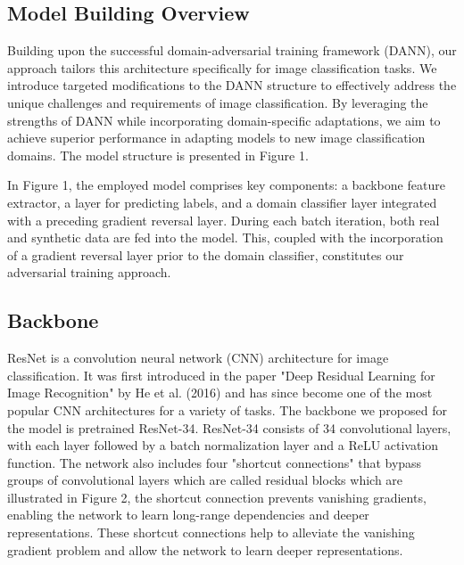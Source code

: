 \documentclass[nonacm, sigconf]{acmart}
\begin{document}
\subsection{Model Building Overview}
Building upon the successful domain-adversarial training framework (DANN), our approach tailors this architecture specifically for image classification tasks. We introduce targeted modifications to the DANN structure to effectively address the unique challenges and requirements of image classification. By leveraging the strengths of DANN while incorporating domain-specific adaptations, we aim to achieve superior performance in adapting models to new image classification domains. The model structure is presented in Figure 1.

\noindent In Figure 1, the employed model comprises key components: a backbone feature extractor, a layer for predicting labels, and a domain classifier layer integrated with a preceding gradient reversal layer. During each batch iteration, both real and synthetic data are fed into the model. This, coupled with the incorporation of a gradient reversal layer prior to the domain classifier, constitutes our adversarial training approach.
\subsection{Backbone}
ResNet is a convolution neural network (CNN) architecture for image classification. It was first introduced in the paper "Deep Residual Learning for Image Recognition" by He et al. (2016)\cite{20} and has since become one of the most popular CNN architectures for a variety of tasks. The backbone we proposed for the model is pretrained ResNet-34. ResNet-34 consists of 34 convolutional layers, with each layer followed by a batch normalization layer and a ReLU activation function. The network also includes four "shortcut connections" that bypass groups of convolutional layers which are called residual blocks which are illustrated in Figure 2, the shortcut connection prevents vanishing gradients, enabling the network to learn long-range dependencies and deeper representations. These shortcut connections help to alleviate the vanishing gradient problem and allow the network to learn deeper representations. 
\end{document}
